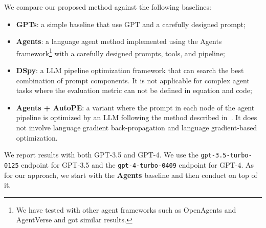 We compare our proposed method against the following baselines:
\begin{itemize}
    \item \textbf{GPTs}: a simple baseline that use GPT and a carefully designed prompt; 
    \item \textbf{Agents}: a language agent method implemented using the Agents~\citep{zhou2023agents} framework\footnote{We have tested with other agent frameworks such as OpenAgents and AgentVerse and got similar results.} with a carefully designed prompts, tools, and pipeline;
    \item \textbf{DSpy}: a LLM pipeline optimization framework that can search the best combination of prompt components. It is not applicable for complex agent tasks where the evaluation metric can not be defined in equation and code;
    \item  \textbf{Agents + AutoPE}: a variant where the prompt in each node of the agent pipeline is optimized by an LLM following the method described in~\citet{yang2024large}. It does not involve language gradient back-propagation and language gradient-based optimization.
\end{itemize}

We report results with both GPT-3.5 and GPT-4. We use the \texttt{gpt-3.5-turbo-0125} endpoint for GPT-3.5 and the \texttt{gpt-4-turbo-0409} endpoint for GPT-4. As for our approach, we start with the \textbf{Agents} baseline and then conduct \baby on top of it.



